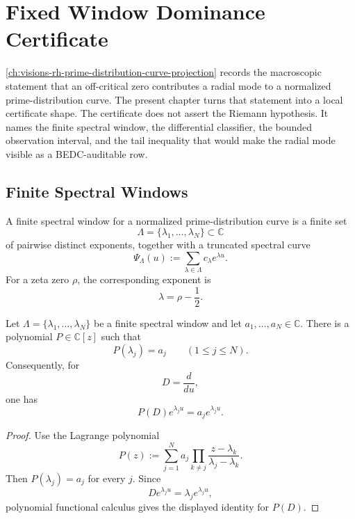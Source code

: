\chapter{Fixed Window Dominance Certificate}
\label{ch:visions-rh-fixed-window-dominance-certificate}

\autoref{ch:visions-rh-prime-distribution-curve-projection} records the
macroscopic statement that an off-critical zero contributes a radial
mode to a normalized prime-distribution curve.  The present chapter
turns that statement into a local certificate shape.  The certificate
does not assert the Riemann hypothesis.  It names the finite spectral
window, the differential classifier, the bounded observation interval,
and the tail inequality that would make the radial mode visible as a
BEDC-auditable row.

\section{Finite Spectral Windows}
\label{sec:rh-fixed-window-finite-spectral-windows}

\begin{definition}
\label{def:rh-finite-spectral-window}
A finite spectral window for a normalized prime-distribution curve is a
finite set
$$
\Lambda=\{\lambda_1,\ldots,\lambda_N\}\subset\mathbb C
$$
of pairwise distinct exponents, together with a truncated spectral
curve
$$
\Psi_\Lambda(u)
:=
\sum_{\lambda\in\Lambda}c_\lambda e^{\lambda u}.
$$
For a zeta zero $\rho$, the corresponding exponent is
$$
\lambda=\rho-\frac12.
$$
\end{definition}

\begin{theorem}
\label{thm:rh-finite-exponential-modes-exact-classifiers}
Let $\Lambda=\{\lambda_1,\ldots,\lambda_N\}$ be a finite spectral
window and let $a_1,\ldots,a_N\in\mathbb C$.  There is a polynomial
$P\in\mathbb C[z]$ such that
$$
P(\lambda_j)=a_j
\qquad
(1\le j\le N).
$$
Consequently, for
$$
D=\frac{d}{du},
$$
one has
$$
P(D)e^{\lambda_j u}=a_j e^{\lambda_j u}.
$$
\end{theorem}

\begin{proof}
Use the Lagrange polynomial
$$
P(z)
:=
\sum_{j=1}^{N}
a_j
\prod_{k\ne j}
\frac{z-\lambda_k}{\lambda_j-\lambda_k}.
$$
Then $P(\lambda_j)=a_j$ for every $j$.  Since
$$
D e^{\lambda_j u}=\lambda_j e^{\lambda_j u},
$$
polynomial functional calculus gives the displayed identity for
$P(D)$.
\end{proof}

